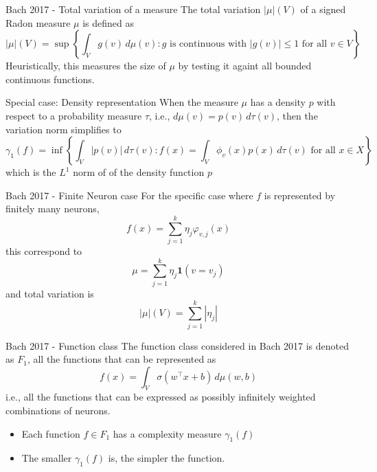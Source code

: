\documentclass[aspectratio=169]{beamer} %
\begin{document}
\begin{frame}{Bach 2017 - Total variation of a measure}
The total variation $|\mu|(V)$ of a signed Radon measure $\mu$ is defined as
$$
|\mu|(V) = \sup\left\{\int_V g(v)\, d\mu(v): g\text{ is continuous with $|g(v)|\le 1$ for all $v\in V$}\right\}
$$
Heuristically, this measures the size of $\mu$ by testing it againt all bounded continuous functions.
\end{frame}
\begin{frame}{Special case: Density representation}
When the measure $\mu$ has a density $p$ with respect to a probability measure $\tau$, i.e., $d\mu(v) = p(v)\, d\tau(v)$, then the variation norm simplifies to
$$
\gamma_1(f) = \inf\left\{\int_V|p(v)|\, d\tau(v): f(x) = \int_V \phi_v(x)p(x)\, d\tau(v)\text{ for all $x\in X$}\right\}
$$
which is the $L^1$ norm of of the density function $p$
 
\end{frame}
\begin{frame}{Bach 2017 - Finite Neuron case}
For the specific case where $f$ is represented by finitely many neurons,
$$
f(x) = \sum_{j=1}^k \eta_j\varphi_{v,j}(x)
$$
this correspond to 
$$
\mu = \sum_{j=1}^k \eta_j \mathbf{1}(v=v_j)
$$
and total variation is
$$
|\mu|(V) = \sum_{j=1}^k|\eta_j|
$$
    
\end{frame}
\begin{frame}{Bach 2017 - Function class}
The function class considered in Bach 2017 is denoted as $F_1$, all the functions that can be represented as
$$
f(x) =\int_V \sigma(w^\top x+ b)\, d\mu(w,b)
$$
i.e., all the functions that can be expressed as possibly infinitely weighted combinations of neurons.
\begin{itemize}
    \item Each function $f\in F_1$ has a complexity measure $\gamma_1(f)$
    \item The smaller $\gamma_1(f)$ is, the simpler the function. 
\end{itemize}
    
\end{frame}
\end{document}
